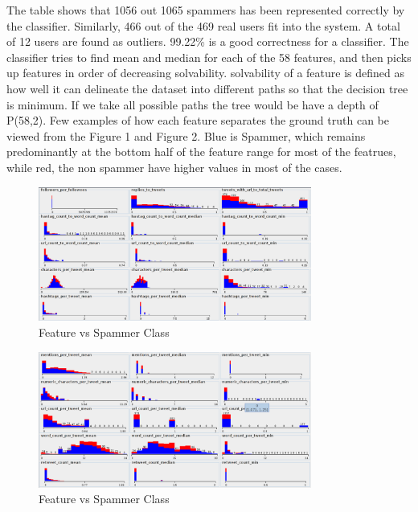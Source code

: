 \documentclass[11pt]{article}
\begin{document}
The table shows that 1056 out 1065 spammers has been represented correctly by the classifier. Similarly, 466 out of the 469 real users fit into the system. A total of 12 users are found as outliers. 99.22\% is a good correctness for a classifier. The classifier tries to find mean and median for each of the 58 features, and then picks up features in order of decreasing solvability. solvability of a feature is defined as how well it can delineate the dataset into different paths so that the decision tree is minimum. If we take all possible paths the tree would be have a depth of P(58,2). Few examples of how each feature separates the ground truth can be viewed from the Figure 1 and Figure 2. Blue is Spammer, which remains predominantly at the bottom half of the feature range for most of the featrues, while red, the non spammer have higher values in most of the cases.

\begin{figure}
\centering
\includegraphics[width=0.80\textwidth,natwidth=610,natheight=642]{feature_vs_spammer_class_1.pdf}
\caption{Feature vs Spammer Class}
\end{figure}

\begin{figure}
\centering
\includegraphics[width=0.80\textwidth,natwidth=610,natheight=642]{feature_vs_spammer_class_2.pdf}
\caption{Feature vs Spammer Class}
\end{figure}
\end{document}
